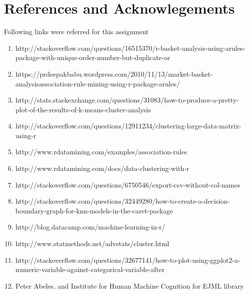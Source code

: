 \documentclass{article}
\begin{document}
\section*{References and Acknowlegements}
Following links were referred for this assignment
\begin{enumerate}
\item http://stackoverflow.com/questions/16515370/r-basket-analysis-using-arules-package-with-unique-order-number-but-duplicate-or
\item https://prdeepakbabu.wordpress.com/2010/11/13/market-basket-analysisassociation-rule-mining-using-r-package-arules/
\item http://stats.stackexchange.com/questions/31083/how-to-produce-a-pretty-plot-of-the-results-of-k-means-cluster-analysis
\item http://stackoverflow.com/questions/12911234/clustering-large-data-matrix-using-r
\item http://www.rdatamining.com/examples/association-rules
\item http://www.rdatamining.com/docs/data-clustering-with-r
\item http://stackoverflow.com/questions/6750546/export-csv-without-col-names
\item http://stackoverflow.com/questions/32449280/how-to-create-a-decision-boundary-graph-for-knn-models-in-the-caret-package
\item http://blog.datacamp.com/machine-learning-in-r/
\item http://www.statmethods.net/advstats/cluster.html
\item http://stackoverflow.com/questions/32677141/how-to-plot-using-ggplot2-a-numeric-variable-against-categorical-variable-after
\item Peter Abeles, and Institute for Human Machine Cognition for EJML library
\end{enumerate}
\end{document}
